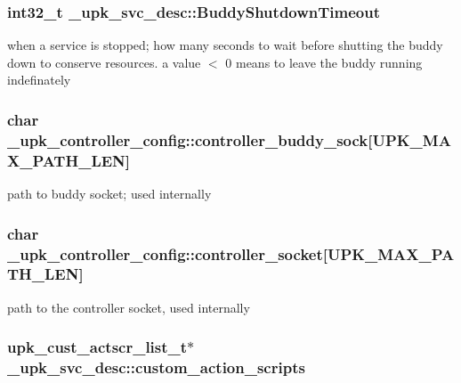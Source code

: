 \subsubsection{\setlength{\rightskip}{0pt plus 5cm}int32\_\-t \bf{\_\-upk\_\-svc\_\-desc::Buddy\-Shutdown\-Timeout}\hspace{0.3cm}{\tt  [inherited]}}\label{group__config__impl_gb50c0ad5c5cf9a7cfcdfea9de4c7f365}


when a service is stopped; how many seconds to wait before shutting the buddy down to conserve resources. a value $<$ 0 means to leave the buddy running indefinately 
\subsubsection{\setlength{\rightskip}{0pt plus 5cm}char \bf{\_\-upk\_\-controller\_\-config::controller\_\-buddy\_\-sock}[UPK\_\-MAX\_\-PATH\_\-LEN]\hspace{0.3cm}{\tt  [inherited]}}\label{group__config__impl_g04dfd26670a146bdbffb167cfdc02bb5}


path to buddy socket; used internally 
\subsubsection{\setlength{\rightskip}{0pt plus 5cm}char \bf{\_\-upk\_\-controller\_\-config::controller\_\-socket}[UPK\_\-MAX\_\-PATH\_\-LEN]\hspace{0.3cm}{\tt  [inherited]}}\label{group__config__impl_gb079f9048afcf82cd17a78e655812289}


path to the controller socket, used internally 
\subsubsection{\setlength{\rightskip}{0pt plus 5cm}\bf{upk\_\-cust\_\-actscr\_\-list\_\-t}$\ast$ \bf{\_\-upk\_\-svc\_\-desc::custom\_\-action\_\-scripts}\hspace{0.3cm}{\tt  [inherited]}}\label{group__config__impl_g68e78fc4786c9119d3443447ef3e0c23}


